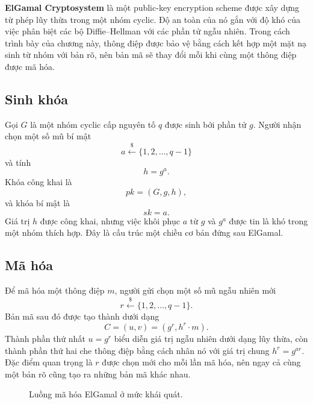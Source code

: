 \textbf{ElGamal Cryptosystem} là một public-key encryption scheme được xây dựng từ phép lũy thừa trong một nhóm cyclic. Độ an toàn của nó gắn với độ khó của việc phân biệt các bộ Diffie--Hellman với các phần tử ngẫu nhiên. Trong cách trình bày của chương này, thông điệp được bảo vệ bằng cách kết hợp một mặt nạ sinh từ nhóm với bản rõ, nên bản mã sẽ thay đổi mỗi khi cùng một thông điệp được mã hóa.

\subsection{Sinh khóa}

Gọi $G$ là một nhóm cyclic cấp nguyên tố $q$ được sinh bởi phần tử $g$. Người nhận chọn một số mũ bí mật
\[
a \xleftarrow{\$} \{1,2,\dots,q-1\}
\]
và tính
\[
h = g^a.
\]
Khóa công khai là
\[
pk = (G,g,h),
\]
và khóa bí mật là
\[
sk = a.
\]
Giá trị $h$ được công khai, nhưng việc khôi phục $a$ từ $g$ và $g^a$ được tin là khó trong một nhóm thích hợp. Đây là cấu trúc một chiều cơ bản đứng sau ElGamal.

\subsection{Mã hóa}

Để mã hóa một thông điệp $m$, người gửi chọn một số mũ ngẫu nhiên mới
\[
r \xleftarrow{\$} \{1,2,\dots,q-1\}.
\]
Bản mã sau đó được tạo thành dưới dạng
\[
C = (u,v) = (g^r, h^r \cdot m).
\]
Thành phần thứ nhất $u=g^r$ biểu diễn giá trị ngẫu nhiên dưới dạng lũy thừa, còn thành phần thứ hai che thông điệp bằng cách nhân nó với giá trị chung $h^r = g^{ar}$. Đặc điểm quan trọng là $r$ được chọn mới cho mỗi lần mã hóa, nên ngay cả cùng một bản rõ cũng tạo ra những bản mã khác nhau.

\begin{figure}[h]
\centering
{}

\vspace{0.4em}

\caption{Luồng mã hóa ElGamal ở mức khái quát.}
\end{figure}

